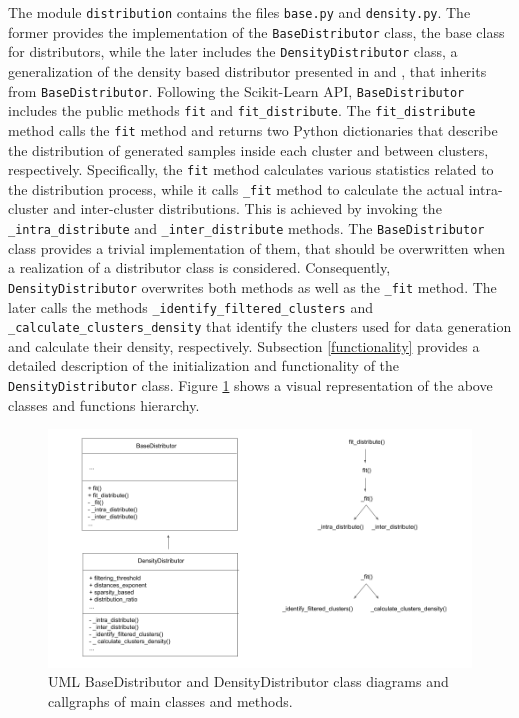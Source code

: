 \documentclass[preprint,12pt, a4paper]{elsarticle}
\begin{document}
The module \texttt{distribution} contains the files \texttt{base.py} and \texttt{density.py}. The former provides the implementation of the \texttt{BaseDistributor} class, the base class for distributors, while the later includes the \texttt{DensityDistributor} class, a generalization of the density based distributor presented in \cite{Douzas2017a} and \cite{Douzas2018}, that inherits from \texttt{BaseDistributor}. Following the Scikit-Learn API, \texttt{BaseDistributor} includes the public methods \texttt{fit} and \texttt{fit\_distribute}. The \texttt{fit\_distribute} method calls the \texttt{fit} method and returns two Python dictionaries that describe the distribution of generated samples inside each cluster and between clusters, respectively. Specifically, the \texttt{fit} method calculates various statistics related to the distribution process, while it calls \texttt{\_fit} method to calculate the actual intra-cluster and inter-cluster distributions. This is achieved by invoking the \texttt{\_intra\_distribute} and \texttt{\_inter\_distribute} methods. The \texttt{BaseDistributor} class provides a trivial implementation of them, that should be overwritten when a realization of a distributor class is considered. Consequently, \texttt{DensityDistributor} overwrites both methods as well as the \texttt{\_fit} method. The later calls the methods \texttt{\_identify\_filtered\_clusters} and \texttt{\_calculate\_clusters\_density} that identify the clusters used for data generation and calculate their density, respectively. Subsection \ref{functionality} provides a detailed description of the initialization and functionality of the \texttt{DensityDistributor} class. Figure \ref{fig:distributor_class_diagram} shows a visual representation of the above classes and functions hierarchy.

\begin{figure}[H]
	\centering
	\includegraphics[width=1\linewidth]{artifacts/distributor_class_diagram}
	\caption{UML BaseDistributor and DensityDistributor class diagrams and callgraphs of main classes and methods.}
	\label{fig:distributor_class_diagram}
\end{figure}
\end{document}

